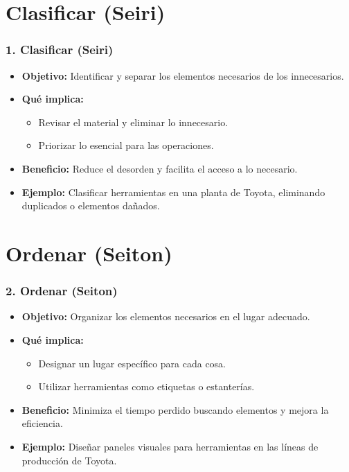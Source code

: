 \documentclass{beamer}
\begin{document}
\section{Clasificar (Seiri)}
\begin{frame}
\frametitle{1. Clasificar (Seiri)}
\begin{itemize}
    \item \textbf{Objetivo:} Identificar y separar los elementos necesarios de los innecesarios.
    \item \textbf{Qué implica:}
        \begin{itemize}
            \item Revisar el material y eliminar lo innecesario.
            \item Priorizar lo esencial para las operaciones.
        \end{itemize}
    \item \textbf{Beneficio:} Reduce el desorden y facilita el acceso a lo necesario.
    \item \textbf{Ejemplo:} Clasificar herramientas en una planta de Toyota, eliminando duplicados o elementos dañados.
\end{itemize}
\end{frame}

\section{Ordenar (Seiton)}
\begin{frame}
\frametitle{2. Ordenar (Seiton)}
\begin{itemize}
    \item \textbf{Objetivo:} Organizar los elementos necesarios en el lugar adecuado.
    \item \textbf{Qué implica:}
        \begin{itemize}
            \item Designar un lugar específico para cada cosa.
            \item Utilizar herramientas como etiquetas o estanterías.
        \end{itemize}
    \item \textbf{Beneficio:} Minimiza el tiempo perdido buscando elementos y mejora la eficiencia.
    \item \textbf{Ejemplo:} Diseñar paneles visuales para herramientas en las líneas de producción de Toyota.
\end{itemize}
\end{frame}
\end{document}
